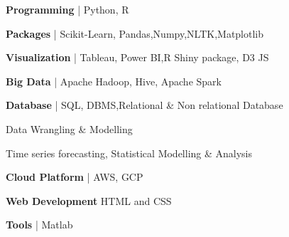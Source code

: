 \documentclass[15pt, a4paper]{awesome-cv}
\begin{document}

\begin{cvskills}
    \cventry
        {} %
        {} %
        {} %
        {} %
        {
        \vspace{-0.6cm}
        \begin{cvitems} %
        \begin{multicols}{2}
            \normalsize{\item{\textbf{Programming} | Python, R}
            \item{\textbf{Packages} | Scikit-Learn, Pandas,Numpy,NLTK,Matplotlib}
            \item{\textbf{Visualization} | Tableau, Power BI,R Shiny package, D3 JS}
            \item{\textbf{Big Data} | Apache Hadoop, Hive, Apache Spark}
            \item{\textbf{Database} | SQL, DBMS,Relational \& Non relational Database}
            \item{Data Wrangling \& Modelling}
            \item{Time series forecasting, Statistical Modelling \& Analysis}
            \item{\textbf{Cloud Platform} | AWS, GCP}
            \item{\textbf{Web Development} HTML and CSS}
            \item{\textbf{Tools} | Matlab}}
        \end{multicols}
        \end{cvitems}
        }
\end{cvskills}
\end{document}
